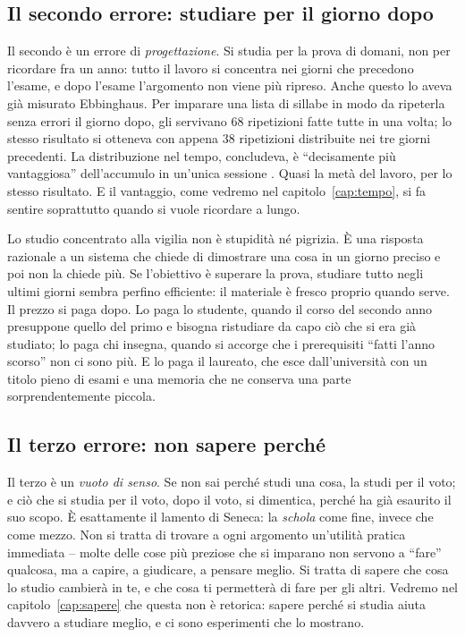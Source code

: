 \subsection*{Il secondo errore: studiare per il giorno dopo}

Il secondo è un errore di \emph{progettazione}. Si studia per la prova
di domani, non per ricordare fra un anno: tutto il lavoro si concentra
nei giorni che precedono l'esame, e dopo l'esame l'argomento non viene
più ripreso. Anche questo lo aveva già misurato Ebbinghaus. Per
imparare una lista di sillabe in modo da ripeterla senza errori il
giorno dopo, gli servivano 68 ripetizioni fatte tutte in una volta;
lo stesso risultato si otteneva con appena 38 ripetizioni distribuite
nei tre giorni precedenti. La distribuzione nel tempo, concludeva, è
\enquote{decisamente più vantaggiosa} dell'accumulo in un'unica sessione
\parencite{ebbinghaus1885}. Quasi la metà del lavoro, per lo stesso
risultato. E il vantaggio, come vedremo nel capitolo~\ref{cap:tempo},
si fa sentire soprattutto quando si vuole ricordare a lungo.

Lo studio concentrato alla vigilia non è stupidità né pigrizia. È una
risposta razionale a un sistema che chiede di dimostrare una cosa in un
giorno preciso e poi non la chiede più. Se l'obiettivo è superare la
prova, studiare tutto negli ultimi giorni sembra perfino efficiente: il
materiale è fresco proprio quando serve. Il prezzo si paga dopo. Lo
paga lo studente, quando il corso del secondo anno presuppone quello del
primo e bisogna ristudiare da capo ciò che si era già studiato; lo paga
chi insegna, quando si accorge che i prerequisiti \enquote{fatti
l'anno scorso} non ci sono più. E lo paga il laureato, che esce
dall'università con un titolo pieno di esami e una memoria che ne
conserva una parte sorprendentemente piccola.

\subsection*{Il terzo errore: non sapere perché}

Il terzo è un \emph{vuoto di senso}. Se non sai perché studi una cosa,
la studi per il voto; e ciò che si studia per il voto, dopo il voto, si
dimentica, perché ha già esaurito il suo scopo. È esattamente il
lamento di Seneca: la \emph{schola} come fine, invece che come mezzo.
Non si tratta di trovare a ogni argomento un'utilità pratica immediata
-- molte delle cose più preziose che si imparano non servono a
\enquote{fare} qualcosa, ma a capire, a giudicare, a pensare meglio. Si
tratta di sapere che cosa lo studio cambierà in te, e che cosa ti
permetterà di fare per gli altri. Vedremo nel capitolo~\ref{cap:sapere}
che questa non è retorica: sapere perché si studia aiuta davvero a
studiare meglio, e ci sono esperimenti che lo mostrano.

